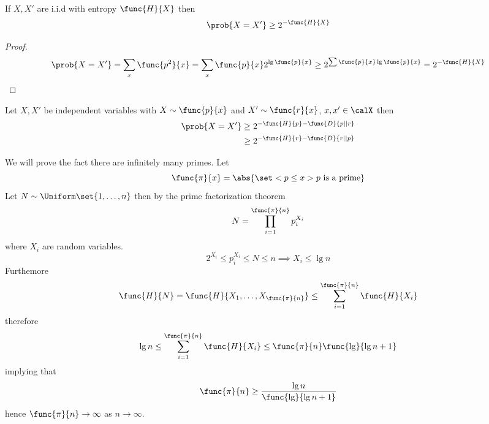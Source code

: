 \begin{lemma}
      If \(X,X'\) are i.i.d with entropy \(\func{H}{X}\) then 
      \begin{equation*}
            \prob{X = X'} \geq 2^{-\func{H}{X}}
      \end{equation*}
\end{lemma}

\begin{proof}
      \begin{align*}
            \prob{X = X'} = \sum_x \func{p^2}{x} = \sum_x \func{p}{x} 2^ {\lg\func{p}{x}} \geq 2^{\sum \func{p}{x} \lg \func{p}{x}} = 2^{-\func{H}{X}}
      \end{align*}
\end{proof}

\begin{corollary}
      Let \(X,X'\) be independent variables with \(X \sim \func{p}{x}\) and \(X' \sim \func{r}{x}\), \(x,x' \in \calX\) then 
      \begin{align*}
            \prob{X = X'} &\geq 2^{-\func{H}{p} - \func{D}{p || r}}\\
            &\geq 2^{- \func{H}{r} - \func{D}{r || p}}
      \end{align*}
\end{corollary}

\begin{example}
      We will prove the fact there are infinitely many primes. Let 
      \begin{equation*}
            \func{\pi}{x} = \abs{\set<p \leq x>{p \ \text{is a prime}}}
      \end{equation*}
      Let \(N \sim \Uniform \set{1,\dots , n}\) then by the prime factorization theorem 
      \begin{equation*}
            N = \prod_{i = 1}^{\func{\pi}{n}} p_i^{X_i}
      \end{equation*}
      where \(X_i\) are random variables. 
      \begin{equation*}
            2^{X_i} \leq p_i^{X_i} \leq N \leq n \implies X_i \leq \lg n
      \end{equation*}
      Furthemore 
      \begin{equation*}
            \func{H}{N} = \func{H}{X_1, \dots , X_{\func{\pi}{n}}} \leq \sum_{i = 1}^{\func{\pi}{n}} \func{H}{X_i}
      \end{equation*}
      therefore 
      \begin{equation*}
            \lg n \leq \sum_{i = 1}^{\func{\pi}{n}}  \func{H}{X_i} \leq \func{\pi}{n} \func{\lg}{\lg n + 1}
      \end{equation*}
      implying that 
      \begin{equation*}
            \func{\pi}{n} \geq \dfrac{\lg n}{\func{\lg}{\lg n + 1}}
      \end{equation*}
      hence \(\func{\pi}{n} \to \infty\) as \(n \to \infty\).
\end{example}

